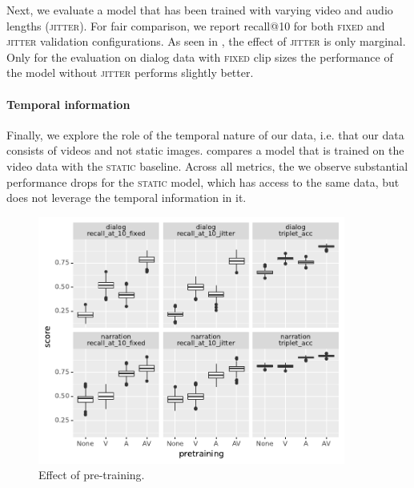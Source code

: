 Next, we evaluate a model that has been trained with varying video and audio 
lengths (\textsc{jitter}). For fair comparison, we report recall@10 for both 
\textsc{fixed} and \textsc{jitter} validation configurations.
As seen in , the effect of \textsc{jitter} is only marginal. 
Only for the evaluation on dialog data with \textsc{fixed} clip sizes 
the performance of the model without \textsc{jitter} performs slightly 
better.


\paragraph{Temporal information}
Finally, we explore the role of the temporal nature of our data, i.e. that our 
data consists of videos and not static images.
 compares a model that is trained on the video data with the 
\textsc{static} baseline. Across all metrics, the we observe substantial 
performance drops for the \textsc{static} model, which has access to the same 
data, but does not leverage the temporal information in it.






\begin{figure}[htb]
	\centering
	\includegraphics[width=0.9\textwidth]{results/ablations/pretraining.pdf}
	\caption{Effect of pre-training.}
	\label{fig:pretraining}
\end{figure}

